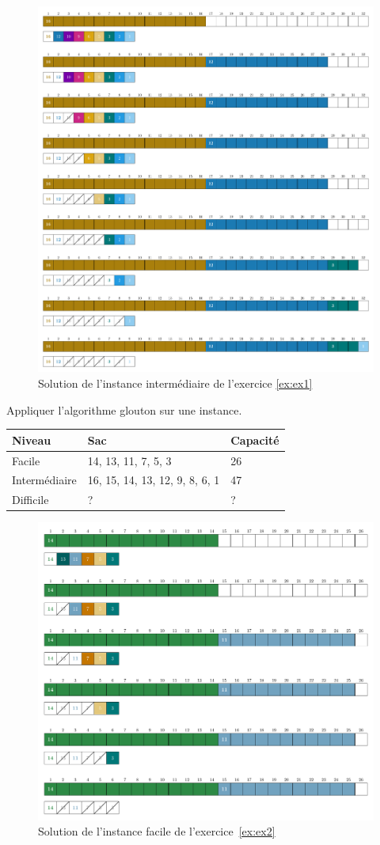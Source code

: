 \documentclass[11pt]{article}
\begin{document}
    \begin{figure}[htbp]
    \centering
    \includegraphics[width=0.6\linewidth]{ex1-9-GS.pdf}
    \caption{Solution de l'instance intermédiaire de l'exercice \ref{ex:ex1}}
  \end{figure}


  \begin{exercice}{}
    \label{ex:ex2}
    Appliquer l'algorithme glouton sur une instance.\\
    \begin{tabular}{lll}
      \toprule
      Niveau & Sac & Capacité \\
      \midrule
      Facile & 14, 13, 11, 7, 5, 3 & 26 \\
      Intermédiaire & 16, 15, 14, 13, 12, 9, 8, 6, 1 & 47 \\
      Difficile & ? & ? \\
      \bottomrule
      \end{tabular}
  \end{exercice}

  \begin{figure}[htbp]
    \centering
    \includegraphics[width=0.6\linewidth]{ex2-6-GS.pdf}
    \caption{Solution de l'instance facile de l'exercice~\ref{ex:ex2}}
  \end{figure}
\end{document}
